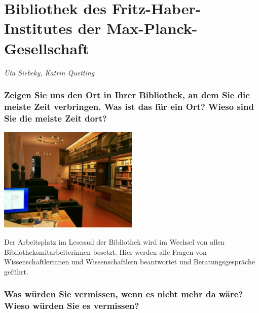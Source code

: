 
\vspace*{.5cm}
\section{Bibliothek des Fritz-Haber-Institutes der Max-Planck-Gesellschaft}
\begin{center}
\emph{Uta Siebeky, Katrin Quetting}
\end{center}
\vspace*{1cm}

\hypertarget{zeigen-sie-uns-den-ort-in-ihrer-bibliothek-an-dem-sie-die-meiste-zeit-verbringen.-was-ist-das-fuxfcr-ein-ort-wieso-sind-sie-die-meiste-zeit-dort}{%
\subsubsection*{Zeigen Sie uns den Ort in Ihrer Bibliothek, an dem Sie die
meiste Zeit verbringen. Was ist das für ein Ort? Wieso sind Sie die
meiste Zeit
dort?}\label{zeigen-sie-uns-den-ort-in-ihrer-bibliothek-an-dem-sie-die-meiste-zeit-verbringen.-was-ist-das-fuxfcr-ein-ort-wieso-sind-sie-die-meiste-zeit-dort}}

\begin{center}
\includegraphics[width=0.5\textwidth]{fhi/img/arbeitsplatz-lesesaal.jpg}
\end{center}

Der Arbeitsplatz im Lesesaal der Bibliothek wird im Wechsel von allen
Bibliotheksmitarbeiterinnen besetzt. Hier werden alle Fragen von
Wissenschaftlerinnen und Wissenschaftlern beantwortet und
Beratungsgespräche geführt.

\hypertarget{was-wuxfcrden-sie-vermissen-wenn-es-nicht-mehr-da-wuxe4re-wieso-wuxfcrden-sie-es-vermissen}{%
\subsubsection*{Was würden Sie vermissen, wenn es nicht mehr da wäre? Wieso
würden Sie es
vermissen?}\label{was-wuxfcrden-sie-vermissen-wenn-es-nicht-mehr-da-wuxe4re-wieso-wuxfcrden-sie-es-vermissen}}


